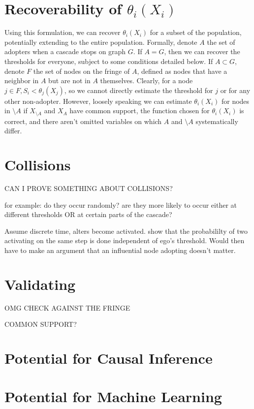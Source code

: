 \documentclass{article}
\begin{document}
\section{Recoverability of $\theta_i(X_i)$}

Using this formulation, we can recover $\theta_i(X_i)$ for a subset of the population, potentially extending to the entire population. Formally, denote $A$ the set of adopters when a cascade stops on graph $G$. If $A = G$, then we can recover the thresholds for everyone, subject to some conditions detailed below. If $A \subset G$, denote $F$ the set of nodes on the fringe of $A$, defined as nodes that have a neighbor in $A$ but are not in $A$ themselves. Clearly, for a node $j \in F, S_i < \theta_j(X_j)$, so we cannot directly estimate the threshold for $j$ or for any other non-adopter. However, loosely speaking we can estimate $\theta_i(X_i)$ for nodes in $\setminus A$ if $X_{\setminus A}$ and $X_A$ have common support, the function chosen for $\theta_i(X_i)$ is correct, and there aren't omitted variables on which $A$ and $\setminus A$ systematically differ. 

\section{Collisions}

CAN I PROVE SOMETHING ABOUT COLLISIONS?

for example: do they occur randomly? are they more likely to occur either at different thresholds OR at certain parts of the cascade?

Assume discrete time, alters become activated. show that the probabililty of two activating on the same step is done independent of ego's threshold. Would then have to make an argument that an influential node adopting doesn't matter. 

\section{Validating}

OMG CHECK AGAINST THE FRINGE

COMMON SUPPORT?

\section{Potential for Causal Inference}

\section{Potential for Machine Learning}
\end{document}
